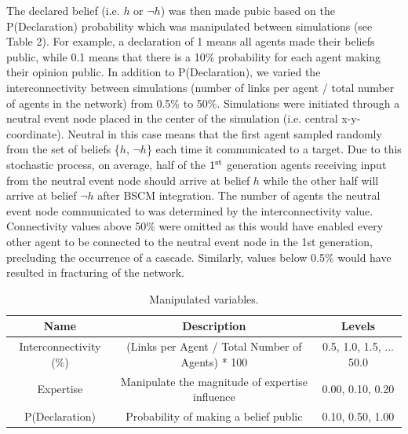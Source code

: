 \documentclass[doc,floatsintext]{apa6}
\begin{document}
The declared belief (i.e. \(h\) or \(\neg h\))  was then made pubic based on the P(Declaration) probability which was manipulated between simulations (see Table 2). For example, a declaration of 1 means all agents made their beliefs public, while 0.1 means that there is a 10\% probability for each agent making their opinion public. In addition to P(Declaration), we varied the interconnectivity between simulations (number of links per agent / total number of agents in the network) from 0.5\% to 50\%. Simulations were initiated through a neutral event node placed in the center of the simulation (i.e. central x-y-coordinate). Neutral in this case means that the first agent sampled randomly from the set of beliefs \{\(h\), \(\neg h\)\} each time it communicated to a target. Due to this stochastic process, on average, half of the \(1\textsuperscript{st}\) generation agents receiving input from the neutral event node should arrive at belief \(h\) while the other half will arrive at belief \(\neg h\) after BSCM integration. The number of agents the neutral event node communicated to was determined by the interconnectivity value. Connectivity values above 50\% were omitted as this would have enabled every other agent to be connected to the neutral event node in the 1st generation, precluding the occurrence of a cascade. Similarly, values below 0.5\% would have resulted in fracturing of the network. 

\begin{table}[!h]
\footnotesize
\begin{center} 
\caption{Manipulated variables.} 
\label{sample-table} 
\vskip 0.10in
\begin{tabular}{c c c} 
\hline
Name & Description & Levels\\
\hline
Interconnectivity (\%) & (Links per Agent / Total Number of Agents) * 100 & 0.5, 1.0, 1.5, ... 50.0\\
Expertise & Manipulate the magnitude of expertise influence & 0.00, 0.10, 0.20\\
P(Declaration) & Probability of making a belief public & 0.10, 0.50, 1.00\\
\hline
\end{tabular} 
\end{center} 
\end{table}
\end{document}
